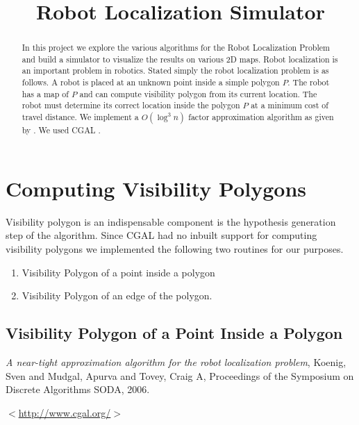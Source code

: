 \documentclass[a4paper,10pt]{article}
\title{Robot Localization Simulator}
\author{}
\begin{document}
\maketitle

\begin{abstract}
In this project we explore the various algorithms for the Robot Localization Problem and build a simulator to visualize the results on
various 2D maps.
Robot localization is an important problem in robotics. Stated simply the robot localization problem is as follows. A robot is 
placed at an unknown point inside a simple polygon $ P $. The robot has a map of 
$ P$ and can compute visibility polygon from its current location. The robot must determine its correct 
location inside the polygon $P $ at a minimum cost of travel distance. We implement a ${O(\log^3 n)} $ factor approximation algorithm 
as given by \cite{key1}. We used CGAL \cite{key2}.

\end{abstract}

\newpage

\section{Computing Visibility Polygons}
Visibility polygon is an indispensable component is the hypothesis generation step of the algorithm. Since CGAL had no inbuilt support
 for computing visibility polygons we implemented the following two routines for our purposes.
\begin{enumerate}
 \item Visibility Polygon of a point inside a polygon
 \item Visibility Polygon of an edge of the polygon.
\end{enumerate}

\subsection{Visibility Polygon of a Point Inside a Polygon}

\newpage

\begin{thebibliography}{1}
 \emph{A near-tight approximation algorithm for the robot localization problem},
 Koenig, Sven and Mudgal, Apurva and Tovey, Craig A, Proceedings of the Symposium on Discrete Algorithms SODA, 2006.

 $<$\url{http://www.cgal.org/}$>$
\end{thebibliography}
\end{document}
